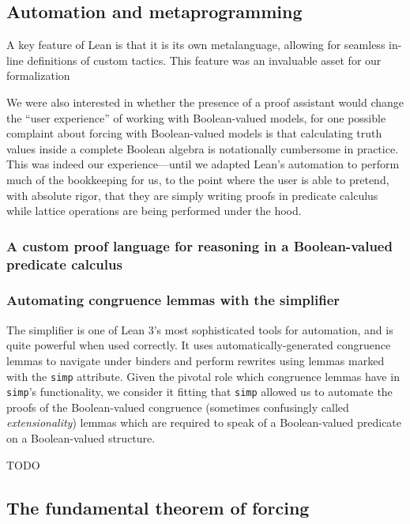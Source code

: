 \documentclass[a4paper,USenglish,cleveref, autoref]{lipics-v2019}
\begin{document}
\subsection{Automation and metaprogramming}
A key feature of Lean is that it is its own metalanguage, allowing for seamless in-line definitions of custom tactics. This feature was an invaluable asset for our formalization

We were also interested in whether the presence of a proof assistant would change the ``user experience'' of working with Boolean-valued models, for one possible complaint about forcing with Boolean-valued models is that calculating truth values inside a complete Boolean algebra is notationally cumbersome in practice. This was indeed our experience---until we adapted Lean's automation to perform much of the bookkeeping for us, to the point where the user is able to pretend, with absolute rigor, that they are simply writing proofs in predicate calculus while lattice operations are being performed under the hood.
\subsubsection{A custom proof language for reasoning in a Boolean-valued predicate calculus}


\subsubsection{Automating congruence lemmas with the simplifier}
The simplifier is one of Lean 3's most sophisticated tools for automation, and is quite powerful when used correctly. It uses automatically-generated congruence lemmas to navigate under binders and perform rewrites using lemmas marked with the \lstinline{simp} attribute. Given the pivotal role which congruence lemmas have in \lstinline{simp}'s functionality, we consider it fitting that \lstinline{simp} allowed us to automate the proofs of the Boolean-valued congruence (sometimes confusingly called \emph{extensionality}) lemmas which are required to speak of a Boolean-valued predicate on a Boolean-valued structure.

TODO %

\subsection{The fundamental theorem of forcing}
\end{document}
